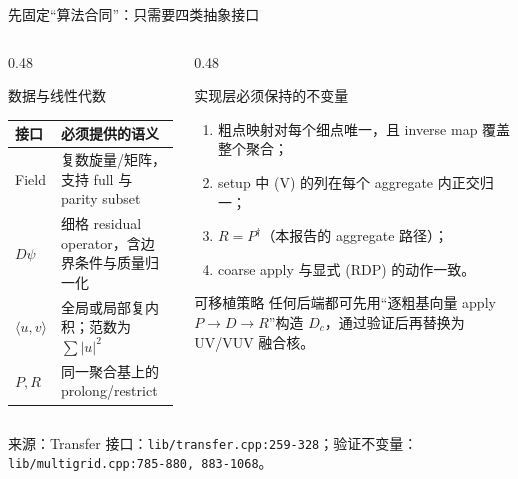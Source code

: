 \documentclass[UTF8,aspectratio=169,11pt]{ctexbeamer}
\newcommand{\source}[1]{\vspace{0.05em}\par{\raggedright\scriptsize\color{muted}来源：#1\par}}
\newcommand{\codepath}[1]{\nolinkurl{#1}}
\begin{document}
\begin{frame}[t]{先固定“算法合同”：只需要四类抽象接口}
  \small
  \begin{columns}[T,totalwidth=\textwidth]
    \begin{column}{0.48\textwidth}
      \begin{block}{数据与线性代数}
        \begin{tabularx}{\linewidth}{@{}lX@{}}
          \toprule
          接口 & 必须提供的语义 \\
          \midrule
          Field & 复数旋量/矩阵，支持 full 与 parity subset \\
          \(D\psi\) & 细格 residual operator，含边界条件与质量归一化 \\
          \(\langle u,v\rangle\) & 全局或局部复内积；范数为 \(\sum |u|^2\) \\
          \(P,R\) & 同一聚合基上的 prolong/restrict \\
          \bottomrule
        \end{tabularx}
      \end{block}
    \end{column}
    \begin{column}{0.48\textwidth}
      \begin{block}{实现层必须保持的不变量}
        \begin{enumerate}\setlength{\itemsep}{0pt}
          \item 粗点映射对每个细点唯一，且 inverse map 覆盖整个聚合；
          \item setup 中 (V) 的列在每个 aggregate 内正交归一；
          \item \(R=P^\dagger\)（本报告的 aggregate 路径）；
          \item coarse apply 与显式 (RDP) 的动作一致。
        \end{enumerate}
      \end{block}
      \begin{alertblock}{可移植策略}
        任何后端都可先用“逐粗基向量 apply \(P\to D\to R\)”构造 \(D_c\)，通过验证后再替换为 UV/VUV 融合核。
      \end{alertblock}
    \end{column}
  \end{columns}
  \source{Transfer 接口：\codepath{lib/transfer.cpp:259-328}；验证不变量：\codepath{lib/multigrid.cpp:785-880, 883-1068}。}
\end{frame}
\end{document}
